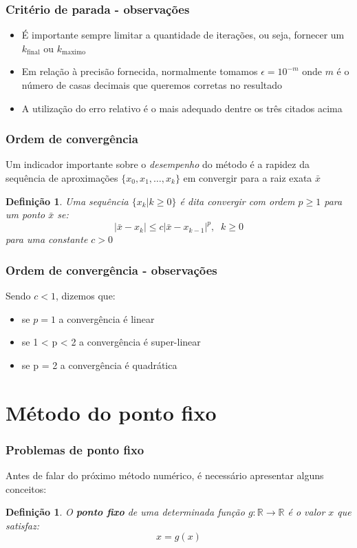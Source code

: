 \documentclass{beamer}
\newtheorem{definicao}[theorem]{Definição}
\theoremstyle{mystyle}
\begin{document}
\begin{frame}
	\frametitle{Critério de parada - observações}
	\begin{itemize}
		\item É importante sempre limitar a quantidade de iterações, ou seja, fornecer um $ k_{\mbox{final}} $ ou $ k_{\mbox{maximo}} $
		\item Em relação à precisão fornecida, normalmente tomamos $ \epsilon = 10^{-m} $ onde $ m $ é o número de casas decimais que queremos corretas no resultado
		\item A utilização do erro relativo é o mais adequado dentre os três citados acima
	\end{itemize} 	
\end{frame}

\begin{frame}
	\frametitle{Ordem de convergência}
	Um indicador importante sobre o \textit{desempenho} do método é a rapidez da sequência de aproximações $ \{x_{0}, x_{1},\ldots, x_{k}\} $ em convergir para a raiz exata $ \bar{x} $
	\begin{definicao}
		Uma sequência $ \{x_{k}| k \geq 0\} $ é dita convergir com ordem $ p \geq 1 $ para um ponto $ \bar{x} $ se:
		\begin{equation*}
			|\bar{x} - x_{k}| \leq c |\bar{x} - x_{k - 1}|^{p},\;\; k \geq 0  
		\end{equation*}
		para uma constante $ c > 0 $
	\end{definicao}
\end{frame}

\begin{frame}
	\frametitle{Ordem de convergência - observações}
	Sendo $ c < 1 $, dizemos que:
	\begin{itemize}
		\item se $ p = 1 $ a convergência é linear
		\item se 1 < p < 2 a convergência é super-linear
		\item se p = 2 a convergência é quadrática
	\end{itemize} 
\end{frame}

\section{Método do ponto fixo}

\begin{frame}
	\frametitle{Problemas de ponto fixo}
	Antes de falar do próximo método numérico, é necessário apresentar alguns conceitos:
	\begin{definicao}
		O \textbf{ponto fixo} de uma determinada função $ g: \mathbb{R} \rightarrow \mathbb{R} $ é o valor $ x $ que satisfaz: 
		\begin{equation*}
			x = g(x)
		\end{equation*}
	\end{definicao}
\end{frame}
\end{document}
